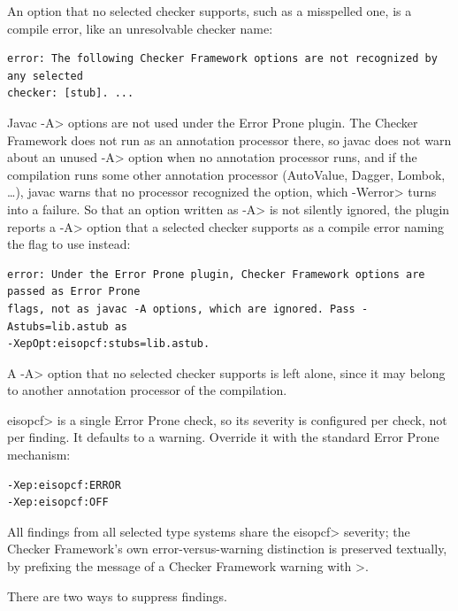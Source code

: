 An option that no selected checker supports, such as a misspelled one, is a compile error,
like an unresolvable checker name:
\begin{Verbatim}
error: The following Checker Framework options are not recognized by any selected
checker: [stub]. ...
\end{Verbatim}

Javac \<-A> options are not used under the Error Prone plugin.  The Checker Framework does
not run as an annotation processor there, so javac does not warn about an unused \<-A>
option when no annotation processor runs, and if the compilation runs some other
annotation processor (AutoValue, Dagger, Lombok, \ldots{}), javac warns that no processor
recognized the option, which \<-Werror> turns into a failure.  So that an option written
as \<-A> is not silently ignored, the plugin reports a \<-A> option that a selected
checker supports as a compile error naming the flag to use instead:
\begin{Verbatim}
error: Under the Error Prone plugin, Checker Framework options are passed as Error Prone
flags, not as javac -A options, which are ignored. Pass -Astubs=lib.astub as
-XepOpt:eisopcf:stubs=lib.astub.
\end{Verbatim}
A \<-A> option that no selected checker supports is left alone, since it may belong to
another annotation processor of the compilation.


\<eisopcf> is a single Error Prone check, so its severity is configured per check, not per
finding.  It defaults to a warning.  Override it with the standard Error Prone mechanism:
\begin{Verbatim}
-Xep:eisopcf:ERROR
-Xep:eisopcf:OFF
\end{Verbatim}
All findings from all selected type systems share the \<eisopcf> severity; the Checker
Framework's own error-versus-warning distinction is preserved textually, by prefixing the
message of a Checker Framework warning with \<[warning]>.


There are two ways to suppress findings.

